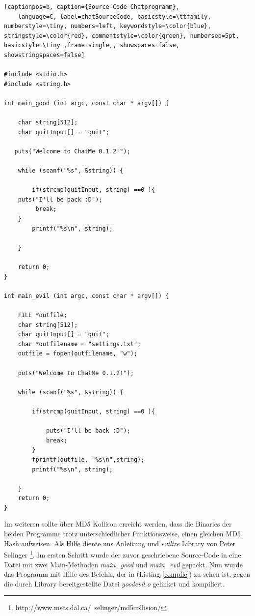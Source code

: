 \documentclass[12pt]{article}
\begin{document}
\begin{lstlisting}[captionpos=b, caption={Source-Code Chatprogramm},
	language=C, label=chatSourceCode, basicstyle=\ttfamily, numberstyle=\tiny, numbers=left, keywordstyle=\color{blue}, stringstyle=\color{red}, commentstyle=\color{green}, numbersep=5pt, basicstyle=\tiny ,frame=single,, showspaces=false, showstringspaces=false]

#include <stdio.h>
#include <string.h>

int main_good (int argc, const char * argv[]) {

    char string[512];
    char quitInput[] = "quit";
   
   puts("Welcome to ChatMe 0.1.2!");
    
    while (scanf("%s", &string)) {
    
    	if(strcmp(quitInput, string) ==0 ){
	puts("I'll be back :D");
         break;
    }
        printf("%s\n", string);
        
    }
    
    return 0;
}

int main_evil (int argc, const char * argv[]) {
    
    FILE *outfile;
    char string[512];
    char quitInput[] = "quit";
    char *outfilename = "settings.txt";
    outfile = fopen(outfilename, "w");
    
    puts("Welcome to ChatMe 0.1.2!");
    
    while (scanf("%s", &string)) {
        
        if(strcmp(quitInput, string) ==0 ){
            
            puts("I'll be back :D");
            break;
        }
        fprintf(outfile, "%s\n",string);
        printf("%s\n", string);
        
    }
    return 0;
}
\end{lstlisting}

Im weiteren sollte über MD5 Kollison erreicht werden, dass die Binaries der beiden Programme trotz unterschiedlicher Funktionsweise, einen gleichen MD5 Hash aufweisen. 
Als Hilfe diente uns Anleitung und \textit{evilize} Library von Peter Selinger \footnote{http://www.mscs.dal.ca/~selinger/md5collision/}. Im ersten Schritt wurde der zuvor geschriebene Source-Code in eine Datei mit zwei Main-Methoden  \textit{main\_good} und  \textit{main\_evil} gepackt. Nun wurde das Programm mit Hilfe des Befehls, der in (Listing \ref{compile}) zu sehen ist, gegen die durch Library bereitgestellte Datei \textit{goodevil.o} gelinket und kompiliert.
\end{document}
